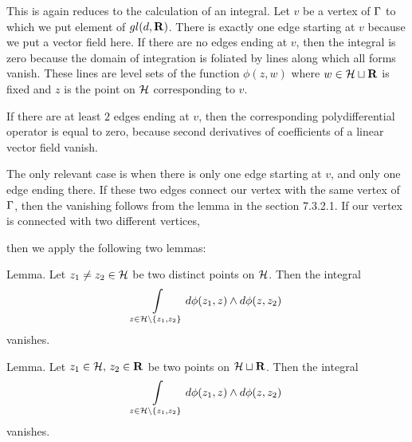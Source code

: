                This is again reduces to the calculation of an integral.
                Let $v$ be a vertex 
                of ${\Gamma}$ to which we put element of $gl(d,{\bf R})$. There
                 is exactly one edge starting at $v$ because we
                 put a vector field here.
            If there are no edges ending at $v$, 
            then the integral is zero because
                  the domain of integration is foliated by lines
                  along which all forms vanish. These
                    lines are 
                    level sets of the function $\phi(z,w)$ where 
                    $w\in {\cal H}\sqcup
                    {\bf R}$
                    is fixed and $z$ is the point on ${\cal H}$ corresponding to
                     $v$.
                    
                   
           \vskip 1cm       \centerline{
} \vskip 11mm

 If there are at least $2$ edges ending at $v$, then the corresponding
  polydifferential operator is equal to zero, because second
   derivatives of coefficients
   of a linear vector field vanish.
                   
                   The only relevant case is when there is only one edge
                    starting at $v$, and only one edge ending
                    there. If these two edges connect our vertex with
                    the same vertex of ${\Gamma}$, then the vanishing follows
                    from the lemma in the section 7.3.2.1. 
                    If our vertex is connected
                     with two different vertices, 
                     
                      
                 \vskip 1cm    \centerline{
} \vskip 11mm \hfill\break
    then we apply the following two
                     lemmas:
                       
             \proclaim Lemma. Let $z_1\ne z_2\in{\cal H}$ be two distinct points
             on ${\cal H}$. Then the integral
              $$\int\limits_{z\in {\cal H}\setminus\{z_1,z_2\}} d\phi(z_1,z)
              \wedge d\phi(z,z_2)$$
              vanishes. \par
              
              \proclaim Lemma. Let $z_1\in {\cal H},\, z_2\in{\bf R}$ be 
              two  points
             on ${\cal H}\sqcup {\bf R}$. Then the integral
              $$\int\limits_{z\in {\cal H}\setminus\{z_1,z_2\}} d\phi(z_1,z)
              \wedge d\phi(z,z_2)$$
              vanishes. \par
              
